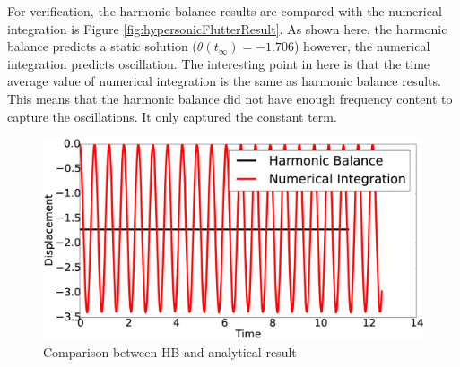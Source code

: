 \documentclass[12pt, a4paper]{extarticle}
\begin{document}
For verification, the harmonic balance results are compared with the numerical integration is Figure \eqref{fig:hypersonicFlutterResult}. As shown here, the harmonic balance predicts a static solution ($\theta(t_\infty) = -1.706$) however, the numerical integration predicts oscillation. The interesting point in here is that the time average value of numerical integration is the same as harmonic balance results. This means that the harmonic balance did not have enough frequency content to capture the oscillations. It only captured the constant term.

\begin{figure}[h]
	\centering
	\includegraphics[width=12.0 cm]{figure/4N9.eps}
	\caption{Comparison between HB and analytical result}
	\label{fig:hypersonicFlutterResult}
\end{figure}



\end{document}
